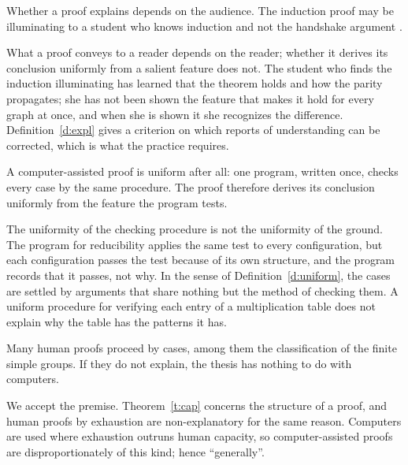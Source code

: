 \documentclass{situationist-preprint}
\begin{document}
\begin{objection}[Relativity]
Whether a proof explains depends on the audience. The induction proof may be illuminating to a student who knows induction and not the handshake argument \citep{ResnikKushner1987}.
\end{objection}

\begin{reply}
What a proof conveys to a reader depends on the reader; whether it derives its conclusion uniformly from a salient feature does not. The student who finds the induction illuminating has learned that the theorem holds and how the parity propagates; she has not been shown the feature that makes it hold for every graph at once, and when she is shown it she recognizes the difference. Definition~\ref{d:expl} gives a criterion on which reports of understanding can be corrected, which is what the practice requires.
\end{reply}

\begin{objection}
A computer-assisted proof is uniform after all: one program, written once, checks every case by the same procedure. The proof therefore derives its conclusion uniformly from the feature the program tests.
\end{objection}

\begin{reply}
The uniformity of the checking procedure is not the uniformity of the ground. The program for reducibility applies the same test to every configuration, but each configuration passes the test because of its own structure, and the program records that it passes, not why. In the sense of Definition~\ref{d:uniform}, the cases are settled by arguments that share nothing but the method of checking them. A uniform procedure for verifying each entry of a multiplication table does not explain why the table has the patterns it has.
\end{reply}

\begin{objection}
Many human proofs proceed by cases, among them the classification of the finite simple groups. If they do not explain, the thesis has nothing to do with computers.
\end{objection}

\begin{reply}
We accept the premise. Theorem~\ref{t:cap} concerns the structure of a proof, and human proofs by exhaustion are non-explanatory for the same reason. Computers are used where exhaustion outruns human capacity, so computer-assisted proofs are disproportionately of this kind; hence ``generally''.
\end{reply}
\end{document}
